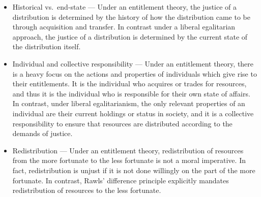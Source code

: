 \begin{itemize}
    \item Historical vs.\ end-state — Under an entitlement theory, the
    justice of a distribution is determined by the history of how the
    distribution came to be through acquisition and transfer. In contrast
    under a liberal egalitarian approach, the justice of a distribution is
    determined by the current state of the distribution itself.
    \item Individual and collective responsibility — Under an entitlement
    theory, there is a heavy focus on the actions and properties of individuals
    which give rise to their entitlements. It is the individual who acquires or
    trades for resources, and thus it is the individual who is responsible for
    their own state of affairs. In contrast, under liberal egalitarianism, the
    only relevant properties of an individual are their current holdings or
    status in society, and it is a collective responsibility to ensure that
    resources are distributed according to the demands of justice.
    \item Redistribution — Under an entitlement theory, redistribution of
    resources from the more fortunate to the less fortunate is not a moral
    imperative. In fact, redistribution is unjust if it is not done willingly on
    the part of the more fortunate. In contrast, Rawls' difference principle
    explicitly mandates redistribution of resources to the less fortunate.
\end{itemize}
